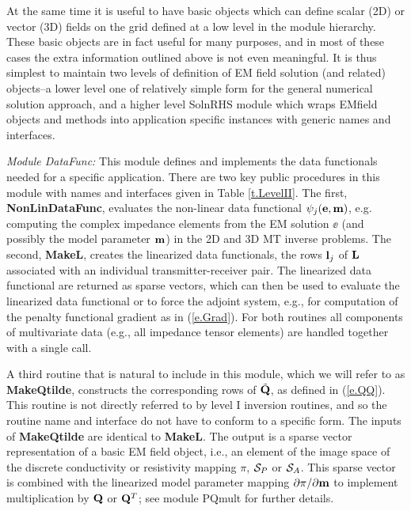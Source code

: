 At the same time it
is useful to have basic objects which can define scalar (2D) or vector
(3D) fields on the grid defined at a low level in the module
hierarchy. These basic objects 
are in fact useful for many purposes, and in most of these cases
the extra information outlined above is not even meaningful.
It is thus simplest to maintain two levels of definition
of EM field solution (and related) objects--a lower level one of relatively
simple form for the general numerical solution approach,
and a higher level SolnRHS module which wraps 
EMfield objects and methods into application specific
instances with generic names and interfaces.

\vspace{6pt}
\noindent
{\em Module DataFunc:} This module defines 
and implements the data functionals needed for a specific application.
There are two key public procedures in this module
with names and interfaces given in Table
\ref{t.LevelII}.
The first, {\bf NonLinDataFunc}, 
evaluates the non-linear data functional $\psi_j({\bf e},{\bf m})$, e.g.
computing the complex impedance elements from the
EM solution $\ee$ (and possibly the model parameter
${\bf m}$) in the 2D and 3D MT inverse problems.  
The second, {\bf MakeL},
creates the linearized data functionals, the rows ${\bf l}_j$ of ${\bf L}$
associated with an individual transmitter-receiver pair.
The linearized data functional are returned as sparse vectors,
which can then be used to evaluate the linearized data functional
or to force the adjoint system, e.g., for computation of the
penalty functional gradient as in (\ref{e.Grad}).
For both routines
all components of multivariate data (e.g., all impedance
tensor elements) are handled together with a single call.

A third routine that is natural to include in this module,
which we will refer to as {\bf MakeQtilde}, constructs the corresponding
rows of $\tilde{{\bf Q}}$, as defined in (\ref{e.QQ}).
This routine is not directly referred to by level I inversion
routines, and so the routine name and interface do not have to conform
to a specific form.  The inputs of {\bf MakeQtilde} are identical to
{\bf MakeL}.  The output is a sparse vector representation of
a basic EM field object,
i.e., an element of the image space of the discrete conductivity 
or resistivity mapping $\pi$, ${\cal S}_P$ or ${\cal S}_A$.
This sparse vector is combined with the linearized model parameter
mapping $\partial\pi/\partial{\bf m}$ to implement multiplication by
${\bf Q}$ or ${\bf Q}^T$; see module PQmult for further details.

